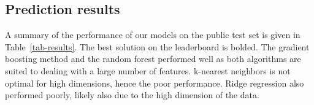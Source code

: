 \documentclass{article}\usepackage[]{graphicx}\usepackage[]{color}
\begin{document}
                                                                                                                                                                                                                                                                                                                                                                                                                                                                                                                                                                                                \subsection{Prediction results}
                                                                                                                                                                                                                                                                                                                                                                                                                                                                                                                                                                                                A summary of the performance of our models on the public test set is given in Table~\ref{tab-results}. The best solution on the leaderboard is bolded. The gradient boosting method and the random forest performed well as both algorithms are suited to dealing with a large number of features. k-nearest neighbors is not optimal for high dimensions, hence the poor performance. Ridge regression also performed poorly, likely also due to the high dimension of the data.
                                                                                                                                                                                                                                                                                                                                                                                                                                                                                                                                                                                                
\end{document}
